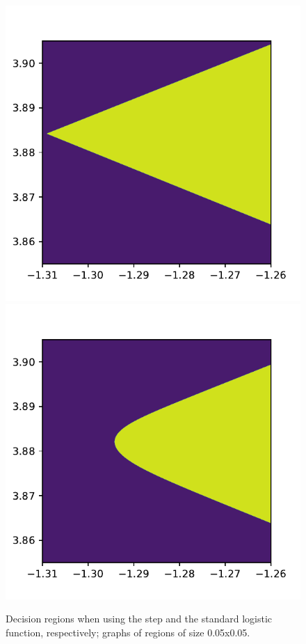 \documentclass[12pt]{article}
\begin{document}
\begin{figure}[!htb]
\includegraphics[scale=0.8]{t2_regions_hNN_AB_veryclose.pdf}
\includegraphics[scale=0.8]{t2_regions_sNN_AB_veryclose.pdf}
\caption{Decision regions when using the step and the standard logistic function, respectively; graphs of regions of size 0.05x0.05.}
\label{regions_comp_closeby}

\end{figure}
\end{document}
